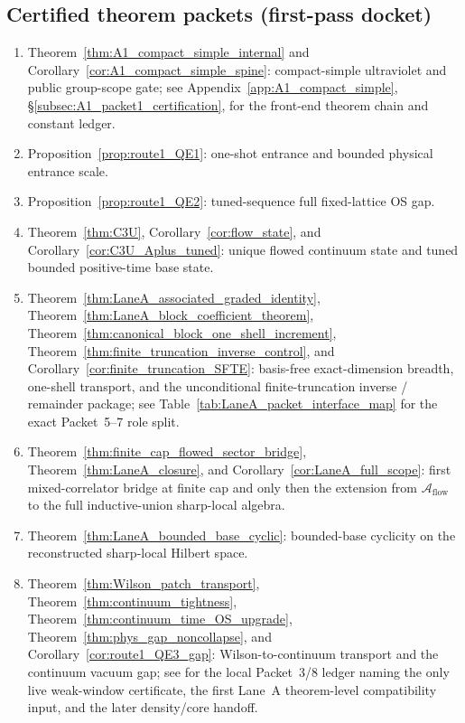 \subsection*{Certified theorem packets (first-pass docket)}
\begin{enumerate}[label=\textbf{Packet \arabic*:},leftmargin=3.35em]
\item Theorem~\ref{thm:A1_compact_simple_internal} and Corollary~\ref{cor:A1_compact_simple_spine}: compact-simple ultraviolet and public group-scope gate; see Appendix~\ref{app:A1_compact_simple}, \S\ref{subsec:A1_packet1_certification}, for the front-end theorem chain and constant ledger.
\item Proposition~\ref{prop:route1_QE1}: one-shot entrance and bounded physical entrance scale.
\item Proposition~\ref{prop:route1_QE2}: tuned-sequence full fixed-lattice OS gap.
\item Theorem~\ref{thm:C3U}, Corollary~\ref{cor:flow_state}, and Corollary~\ref{cor:C3U_Aplus_tuned}: unique flowed continuum state and tuned bounded positive-time base state.
\item Theorem~\ref{thm:LaneA_associated_graded_identity}, Theorem~\ref{thm:LaneA_block_coefficient_theorem}, Theorem~\ref{thm:canonical_block_one_shell_increment}, Theorem~\ref{thm:finite_truncation_inverse_control}, and Corollary~\ref{cor:finite_truncation_SFTE}: basis-free exact-dimension breadth, one-shell transport, and the unconditional finite-truncation inverse / remainder package; see Table~\ref{tab:LaneA_packet_interface_map} for the exact Packet~5--7 role split.
\item Theorem~\ref{thm:finite_cap_flowed_sector_bridge}, Theorem~\ref{thm:LaneA_closure}, and Corollary~\ref{cor:LaneA_full_scope}: first mixed-correlator bridge at finite cap and only then the extension from $\mathcal A_{\mathrm{flow}}$ to the full inductive-union sharp-local algebra.
\item Theorem~\ref{thm:LaneA_bounded_base_cyclic}: bounded-base cyclicity on the reconstructed sharp-local Hilbert space.
\item Theorem~\ref{thm:Wilson_patch_transport}, Theorem~\ref{thm:continuum_tightness}, Theorem~\ref{thm:continuum_time_OS_upgrade}, Theorem~\ref{thm:phys_gap_noncollapse}, and Corollary~\ref{cor:route1_QE3_gap}: Wilson-to-continuum transport and the continuum vacuum gap; see  for the local Packet~3/8 ledger naming the only live weak-window certificate, the first Lane~A theorem-level compatibility input, and the later density/core handoff.

\end{enumerate}
